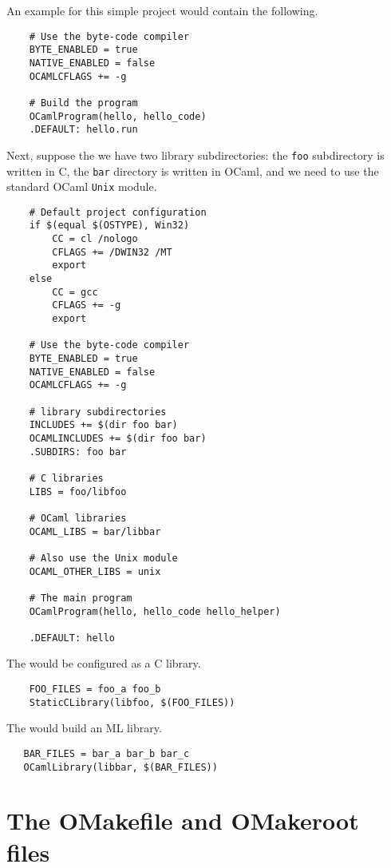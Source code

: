 An example  for this simple project would contain the following.

\begin{verbatim}
    # Use the byte-code compiler
    BYTE_ENABLED = true
    NATIVE_ENABLED = false
    OCAMLCFLAGS += -g

    # Build the program
    OCamlProgram(hello, hello_code)
    .DEFAULT: hello.run
\end{verbatim}

Next, suppose the we have two library subdirectories: the \verb+foo+ subdirectory
is written in C, the \verb+bar+ directory is written in OCaml, and we need to
use the standard OCaml \verb+Unix+ module.

\begin{verbatim}
    # Default project configuration
    if $(equal $(OSTYPE), Win32)
        CC = cl /nologo
        CFLAGS += /DWIN32 /MT
        export
    else
        CC = gcc
        CFLAGS += -g
        export

    # Use the byte-code compiler
    BYTE_ENABLED = true
    NATIVE_ENABLED = false
    OCAMLCFLAGS += -g

    # library subdirectories
    INCLUDES += $(dir foo bar)
    OCAMLINCLUDES += $(dir foo bar)
    .SUBDIRS: foo bar

    # C libraries
    LIBS = foo/libfoo

    # OCaml libraries
    OCAML_LIBS = bar/libbar

    # Also use the Unix module
    OCAML_OTHER_LIBS = unix

    # The main program
    OCamlProgram(hello, hello_code hello_helper)

    .DEFAULT: hello
\end{verbatim}

The  would be configured as a C library.

\begin{verbatim}
    FOO_FILES = foo_a foo_b
    StaticCLibrary(libfoo, $(FOO_FILES))
\end{verbatim}

The  would build an ML library.

\begin{verbatim}
   BAR_FILES = bar_a bar_b bar_c
   OCamlLibrary(libbar, $(BAR_FILES))
\end{verbatim}

\section{The OMakefile and OMakeroot files}
\label{section:omakeroot}

